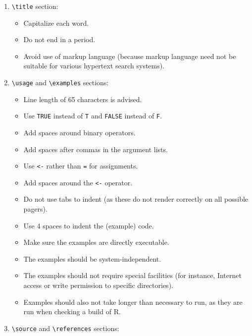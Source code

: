 \documentclass[
  letterpaper,
  DIV=11,
  numbers=noendperiod]{scrreprt}
\providecommand{\tightlist}{%
  \setlength{\itemsep}{0pt}\setlength{\parskip}{0pt}}\usepackage{longtable,booktabs,array}
\begin{document}
\begin{enumerate}
\def\labelenumi{\arabic{enumi}.}
\tightlist
\item
  \texttt{\textbackslash{}title} section:

  \begin{itemize}
  \tightlist
  \item
    Capitalize each word.
  \item
    Do not end in a period.
  \item
    Avoid use of markup language (because markup language need not be
    suitable for various hypertext search systems).
  \end{itemize}
\item
  \texttt{\textbackslash{}usage} and \texttt{\textbackslash{}examples}
  sections:

  \begin{itemize}
  \tightlist
  \item
    Line length of 65 characters is advised.
  \item
    Use \texttt{TRUE} instead of \texttt{T} and \texttt{FALSE} instead
    of \texttt{F}.
  \item
    Add spaces around binary operators.
  \item
    Add spaces after commas in the argument lists.
  \item
    Use \texttt{\textless{}-} rather than \texttt{=} for assignments.
  \item
    Add spaces around the \texttt{\textless{}-} operator.
  \item
    Do not use tabs to indent (as these do not render correctly on all
    possible pagers).
  \item
    Use 4 spaces to indent the (example) code.
  \item
    Make sure the examples are directly executable.
  \item
    The examples should be system-independent.
  \item
    The examples should not require special facilities (for instance,
    Internet access or write permission to specific directories).
  \item
    Examples should also not take longer than necessary to run, as they
    are run when checking a build of R.
  \end{itemize}
\item
  \texttt{\textbackslash{}source} and
  \texttt{\textbackslash{}references} sections:


\end{enumerate}
\end{document}
